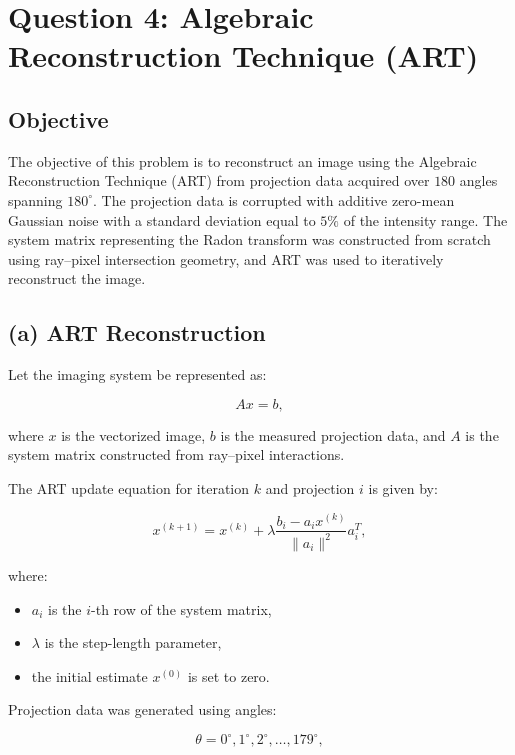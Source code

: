 \documentclass[11pt,a4paper]{article}
\begin{document}
\section*{Question 4: Algebraic Reconstruction Technique (ART)}

\subsection*{Objective}

The objective of this problem is to reconstruct an image using the Algebraic Reconstruction Technique (ART) from projection data acquired over $180$ angles spanning $180^\circ$. The projection data is corrupted with additive zero-mean Gaussian noise with a standard deviation equal to $5\%$ of the intensity range. The system matrix representing the Radon transform was constructed from scratch using ray–pixel intersection geometry, and ART was used to iteratively reconstruct the image.

\subsection*{(a) ART Reconstruction}

Let the imaging system be represented as:

\[
Ax = b,
\]

where $x$ is the vectorized image, $b$ is the measured projection data, and $A$ is the system matrix constructed from ray–pixel interactions.

The ART update equation for iteration $k$ and projection $i$ is given by:

\[
x^{(k+1)}
=
x^{(k)}
+
\lambda
\frac{b_i - a_i x^{(k)}}{\|a_i\|^2}
a_i^T,
\]

where:

\begin{itemize}
\item $a_i$ is the $i$-th row of the system matrix,
\item $\lambda$ is the step-length parameter,
\item the initial estimate $x^{(0)}$ is set to zero.
\end{itemize}

Projection data was generated using angles:

\[
\theta = 0^\circ, 1^\circ, 2^\circ, \ldots, 179^\circ,
\]
\end{document}
